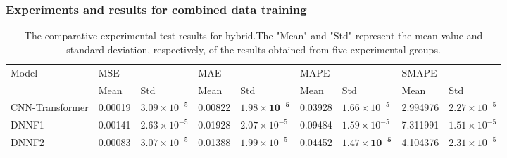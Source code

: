 \documentclass[acmsmall,manuscript, screen, review]{acmart}
\begin{document}
\subsubsection{Experiments and results for combined data training}


\begin{table}[htbp]
  \centering
  \caption{The comparative experimental test results for hybrid.The "Mean" and "Std" represent the mean value and standard deviation, respectively, of the results obtained from five experimental groups.}
    \begin{tabular}{lllllllll}
    \toprule
    \multirow{2}[4]{*}{Model} & \multicolumn{2}{l}{MSE} & \multicolumn{2}{l}{MAE} & \multicolumn{2}{l}{MAPE} & \multicolumn{2}{l}{SMAPE} \\
\cmidrule{2-9}          & Mean  & Std   & Mean  & Std   & Mean  & Std   & Mean  & Std \\
    \midrule
    CNN-Transformer & 0.00019 & \begin{math}3.09\times 10^{-5}\end{math} & 0.00822 & \begin{math}\mathbf{1.98\times 10^{-5}}\end{math} & 0.03928 & \begin{math}1.66\times 10^{-5}\end{math} & 2.994976 & \begin{math}2.27\times 10^{-5}\end{math} \\
    DNNF1 & 0.00141 & \begin{math}2.63\times 10^{-5}\end{math} & 0.01928 & \begin{math}2.07\times 10^{-5}\end{math} & 0.09484 & \begin{math}1.59\times 10^{-5}\end{math} & 7.311991 & \begin{math}1.51\times 10^{-5}\end{math} \\
    DNNF2 & 0.00083 & \begin{math}3.07\times 10^{-5}\end{math} & 0.01388 & \begin{math}1.99\times 10^{-5}\end{math} & 0.04452 & \begin{math}\mathbf{1.47\times 10^{-5}}\end{math} & 4.104376 & \begin{math}2.31\times 10^{-5}\end{math} \\

\end{tabular}
\end{table}
\end{document}
